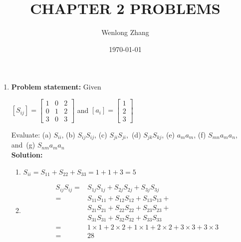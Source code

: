 \documentclass[a4paper, 12pt]{article}
\title{\textbf{CHAPTER 2 PROBLEMS}}
\author{Wenlong Zhang}
\date{\today}
\begin{document}
\maketitle

\begin{enumerate}
    \item \textbf{Problem statement:} Given \\
    \begin {center}
    \begin{math}
        \left[ S_{ij}\right] = \begin{bmatrix}
                1 & 0 & 2 \\
                0 & 1 & 2 \\
                3 & 0 & 3
            \end{bmatrix}
    \end{math} and
    \begin{math}
        \left[ a_{i}\right] = \begin{bmatrix}
                1 \\
                2 \\
                3
            \end{bmatrix}
    \end{math}
    \end {center}
    Evaluate: (a) \(S_{ii}\), (b) $S_{ij}S_{ij}$, (c) $S_{ji}S_{ji}$,\
    (d) $S_{jk}S_{kj}$, (e) $a_{m}a_{m}$, (f) $S_{mn}a_{m}a_{n}$, and\
    (g) $S_{nm}a_{m}a_{n}$ \\

    \textbf{Solution:}
    \begin{enumerate}
        \item \(S_{ii} = S_{11}+S_{22}+S_{33} = 1 + 1 + 3 = 5\)
        \item 
              \begin{align*}
              S_{ij}S_{ij} = & S_{1j}S_{1j} + S_{2j}S_{2j} + S_{3j}S_{3j}\\
                             = & S_{11}S_{11} + S_{12}S_{12} + S_{13}S_{13} + \\
                               & S_{21}S_{21} + S_{22}S_{22} + S_{23}S_{23} + \\
                               & S_{31}S_{31} + S_{32}S_{32} + S_{33}S_{33}\\
                             = & 1\times1 + 2\times2 + 1\times1 + 2\times2 + 3\times3 + 3\times3\\
                             = & 28
              \end{align*}
    \end{enumerate}
 \end{enumerate}

 
\end{document}
